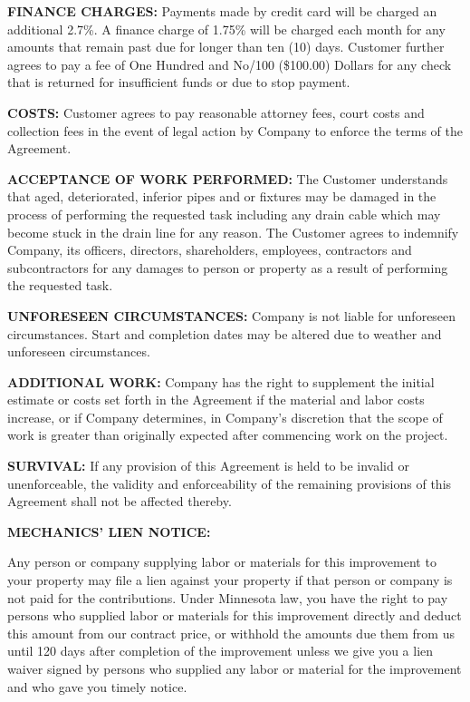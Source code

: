 \documentclass{article}
\begin{document}
\begin{footnotesize}
\noindent \textbf{FINANCE CHARGES:} Payments made by credit card will be charged an additional 2.7\%. A finance charge of 1.75\% will be charged each month for any amounts that remain past due for longer than ten (10) days. Customer further agrees to pay a fee of One Hundred and No/100 (\$100.00) Dollars for any check that is returned for insufficient funds or due to stop payment. \vspace{8pt}

\noindent \textbf{COSTS:} Customer agrees to pay reasonable attorney fees, court costs and collection fees in the event of legal action by Company to enforce the terms of the Agreement. \vspace{8pt}

\noindent \textbf{ACCEPTANCE OF WORK PERFORMED:} The Customer understands that aged, deteriorated, inferior pipes and or fixtures may be damaged in the process of performing the requested task including any drain cable which may become stuck in the drain line for any reason. The Customer agrees to indemnify Company, its officers, directors, shareholders, employees, contractors and subcontractors for any damages to person or property as a result of performing the requested task. \vspace{8pt}

\noindent \textbf{UNFORESEEN CIRCUMSTANCES:} Company is not liable for unforeseen circumstances. Start and completion dates may be altered due to weather and unforeseen circumstances. \vspace{8pt}

\noindent \textbf{ADDITIONAL WORK:} Company has the right to supplement the initial estimate or costs set forth in the Agreement if the material and labor costs increase, or if Company determines, in Company’s discretion that the scope of work is greater than originally expected after commencing work on the project. \vspace{8pt}

\noindent \textbf{SURVIVAL:} If any provision of this Agreement is held to be invalid or unenforceable, the validity and enforceability of the remaining provisions of this Agreement shall not be affected thereby. \vspace{8pt}

\begin{center}
    \textbf{MECHANICS' LIEN NOTICE:}
\end{center}
Any person or company supplying labor or materials for this improvement to your property may file a lien against your property if that person or company is not paid for the contributions. Under Minnesota law, you have the right to pay persons who supplied labor or materials for this improvement directly and deduct this amount from our contract price, or withhold the amounts due them from us until 120 days after completion of the improvement unless we give you a lien waiver signed by persons who supplied any labor or material for the improvement and who gave you timely notice.

\end{footnotesize}
\end{document}
